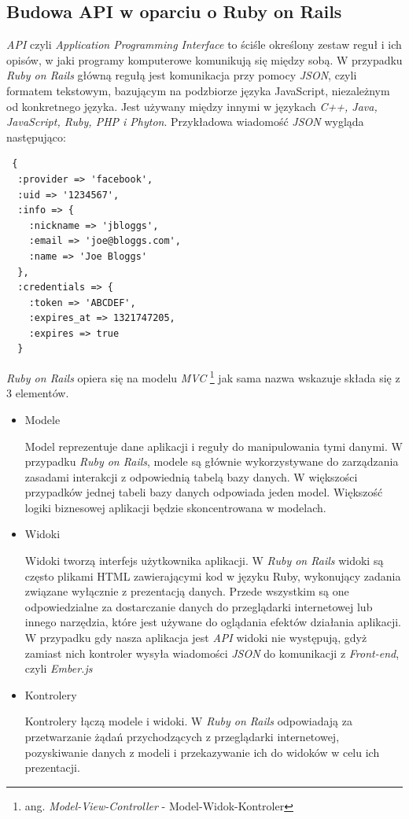 \documentclass[brudnopis]{xmgr}
\begin{document}
\subsection{Budowa API w oparciu o Ruby on Rails}
\textit{API} czyli \textit{Application Programming Interface} to  ściśle określony zestaw reguł i ich opisów, w jaki programy komputerowe komunikują się między sobą. W przypadku \textit{Ruby on Rails} główną regułą jest komunikacja przy pomocy \textit{JSON}, czyli formatem tekstowym, bazującym na podzbiorze języka JavaScript, niezależnym od konkretnego języka. Jest używany między innymi w językach \textit{ C++, Java, JavaScript, Ruby, PHP i Phyton}. Przykładowa wiadomość \textit{JSON} wygląda następująco:
\begin{verbatim}
 {
  :provider => 'facebook',
  :uid => '1234567',
  :info => {
    :nickname => 'jbloggs',
    :email => 'joe@bloggs.com',
    :name => 'Joe Bloggs'
  },
  :credentials => {
    :token => 'ABCDEF', 
    :expires_at => 1321747205, 
    :expires => true 
  }
\end{verbatim}
\newpage
\indent \textit{Ruby on Rails} opiera się na modelu \textit{MVC} \footnote{ang. \textit{Model-View-Controller} - Model-Widok-Kontroler} jak sama nazwa wskazuje składa się z 3 elementów.  
\begin{itemize}
  \item Modele

Model reprezentuje dane aplikacji i reguły do manipulowania tymi danymi. W przypadku \textit{Ruby on Rails}, modele są głównie wykorzystywane do zarządzania zasadami interakcji z odpowiednią tabelą bazy danych. W większości przypadków jednej tabeli bazy danych odpowiada jeden model. Większość logiki biznesowej aplikacji będzie skoncentrowana w modelach.
  \item Widoki

Widoki tworzą interfejs użytkownika aplikacji. W \textit{Ruby on Rails} widoki są często plikami HTML zawierającymi kod w języku Ruby, wykonujący zadania związane wyłącznie z prezentacją danych. Przede wszystkim są one odpowiedzialne za dostarczanie danych do przeglądarki internetowej lub innego narzędzia, które jest używane do oglądania efektów działania aplikacji. W przypadku gdy nasza aplikacja jest \textit{API} widoki nie występują, gdyż zamiast nich kontroler wysyła wiadomości \textit{JSON} do komunikacji z \textit{Front-end}, czyli \textit{Ember.js}
  \item Kontrolery

Kontrolery łączą modele i widoki. W \textit{Ruby on Rails} odpowiadają za przetwarzanie żądań przychodzących z przeglądarki internetowej, pozyskiwanie danych z modeli i przekazywanie ich do widoków w celu ich prezentacji.
\end{itemize}
\end{document}
